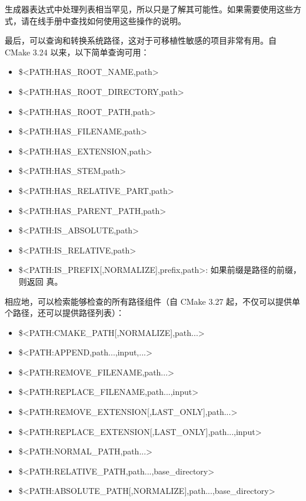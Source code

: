 生成器表达式中处理列表相当罕见，所以只是了解其可能性。如果需要使用这些方式，请在线手册中查找如何使用这些操作的说明。

最后，可以查询和转换系统路径，这对于可移植性敏感的项目非常有用。自 CMake 3.24 以来，以下简单查询可用：

\begin{itemize}
\item
\$<PATH:HAS\_ROOT\_NAME,path>

\item
\$<PATH:HAS\_ROOT\_DIRECTORY,path>

\item
\$<PATH:HAS\_ROOT\_PATH,path>

\item
\$<PATH:HAS\_FILENAME,path>

\item
\$<PATH:HAS\_EXTENSION,path>

\item
\$<PATH:HAS\_STEM,path>

\item
\$<PATH:HAS\_RELATIVE\_PART,path>

\item
\$<PATH:HAS\_PARENT\_PATH,path>

\item
\$<PATH:IS\_ABSOLUTE,path>

\item
\$<PATH:IS\_RELATIVE,path>

\item
\$<PATH:IS\_PREFIX[,NORMALIZE],prefix,path>: 如果前缀是路径的前缀，则返回 真。
\end{itemize}

相应地，可以检索能够检查的所有路径组件（自 CMake 3.27 起，不仅可以提供单个路径，还可以提供路径列表）：

\begin{itemize}
\item
\$<PATH:CMAKE\_PATH[,NORMALIZE],path...>

\item
\$<PATH:APPEND,path...,input,...>

\item
\$<PATH:REMOVE\_FILENAME,path...>

\item
\$<PATH:REPLACE\_FILENAME,path...,input>

\item
\$<PATH:REMOVE\_EXTENSION[,LAST\_ONLY],path...>

\item
\$<PATH:REPLACE\_EXTENSION[,LAST\_ONLY],path...,input>

\item
\$<PATH:NORMAL\_PATH,path...>

\item
\$<PATH:RELATIVE\_PATH,path...,base\_directory>

\item
\$<PATH:ABSOLUTE\_PATH[,NORMALIZE],path...,base\_directory>
\end{itemize}

